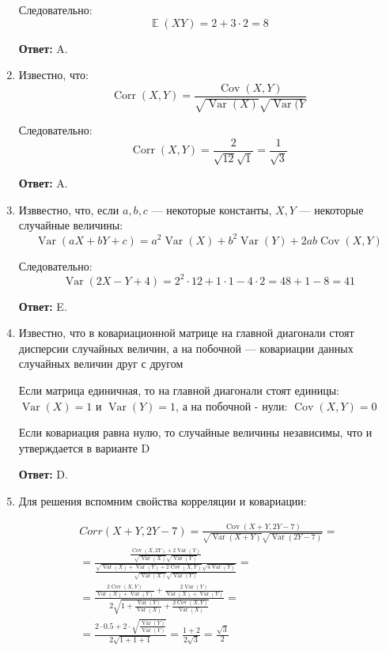 \documentclass[a4paper]{article} %
\DeclareMathOperator{\Var}{Var}
\DeclareMathOperator{\Cov}{Cov}
\DeclareMathOperator{\Corr}{Corr}
\DeclareMathOperator{\E}{\mathbb{E}}
\begin{document}
\begin{enumerate}
    Следовательно:
    \[\E(XY) = 2 + 3\cdot2 = 8\]
    
    \textbf{Ответ:} A.
    
    
    \item 
    Известно, что:
    \[\Corr(X,Y) = \frac{\Cov(X,Y)}{\sqrt{\Var(X)}\sqrt{\Var(Y}}\]
    
    Следовательно:
    \[\Corr(X,Y) = \frac{2}{\sqrt{12}\sqrt{1}} = \frac{1}{\sqrt{3}}\]
    
    \textbf{Ответ:} A.
    
    
    \item
    Изввестно, что, если $a, b, c$ — некоторые константы, $X, Y$ — некоторые случайные величины:
    \[\Var(aX + bY + c) = a^2 \Var(X) + b^2 \Var(Y) + 2ab\Cov(X,Y)\]
    
    Следовательно:
    \[\Var(2X - Y + 4) = 2^2 \cdot 12 + 1 \cdot 1 - 4 \cdot 2 = 48 + 1 - 8 = 41\]
    
    \textbf{Ответ:} E.
    
    
    \item
    Известно, что в ковариационной матрице на главной диагонали стоят дисперсии случайных величин, а на побочной — ковариации данных случайных величин друг с другом
    
    Если матрица единичная, то на главной диагонали стоят единицы: $\Var(X) = 1$ и $\Var(Y) = 1$, а на побочной - нули:  $\Cov(X,Y) = 0$
    
    Если ковариация равна нулю, то случайные величины независимы, что и утверждается в варианте D
    
    \textbf{Ответ:} D.
    

    \item
    Для решения вспомним свойства корреляции и ковариации:
    
    \[ \begin{gathered} Corr(X+Y, 2Y-7) = \frac{\Cov(X+Y, 2Y-7)}{\sqrt{\Var(X+Y)}\sqrt{\Var(2Y-7)}} = \\ 
    =\frac{\frac{\Cov(X, 2Y) + 2 \Var(Y)}{\sqrt{\Var(X)}\sqrt{\Var(Y)}}}{\frac{\sqrt{\Var(X) + \Var(Y) + 2\Cov(X,Y)}\sqrt{4\Var(Y)}}{\sqrt{\Var(X)}\sqrt{\Var(Y)}}} = \\ 
    =\frac{\frac{2\Cov(X, Y)}{\Var(X) + \Var(Y)} + \frac{2 \Var(Y)}{\Var(X) + \Var(Y)}}{2\sqrt{1 + \frac{\Var(Y)}{\Var(X)} + \frac{2\Cov(X,Y)}{\Var(X)}}} = \\ 
    =\frac{2 \cdot 0.5 + 2 \cdot \sqrt{\frac{\Var(Y)}{\Var(Y)}}}{2\sqrt{1 + 1 + 1}} = \frac{1 + 2}{2 \sqrt{3}} = \frac{\sqrt{3}}{2} \end{gathered} \]
    

\end{enumerate}
\end{document}
